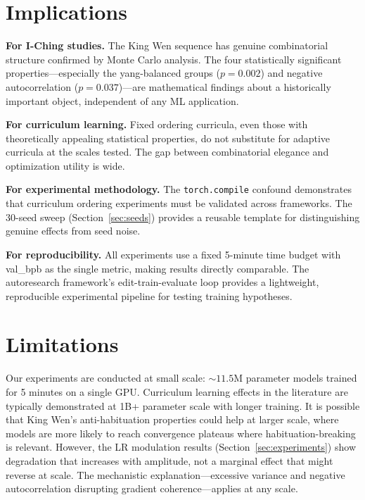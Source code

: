 \documentclass{article}
\begin{document}
\section{Implications}\label{sec:implications}

\textbf{For I-Ching studies.} The King Wen sequence has genuine combinatorial structure confirmed by Monte Carlo analysis. The four statistically significant properties---especially the yang-balanced groups ($p = 0.002$) and negative autocorrelation ($p = 0.037$)---are mathematical findings about a historically important object, independent of any ML application.

\textbf{For curriculum learning.} Fixed ordering curricula, even those with theoretically appealing statistical properties, do not substitute for adaptive curricula at the scales tested. The gap between combinatorial elegance and optimization utility is wide.

\textbf{For experimental methodology.} The \texttt{torch.compile} confound demonstrates that curriculum ordering experiments must be validated across frameworks. The 30-seed sweep (Section~\ref{sec:seeds}) provides a reusable template for distinguishing genuine effects from seed noise.

\textbf{For reproducibility.} All experiments use a fixed 5-minute time budget with val\_bpb as the single metric, making results directly comparable. The autoresearch framework's edit-train-evaluate loop provides a lightweight, reproducible experimental pipeline for testing training hypotheses.

\section{Limitations}\label{sec:limitations}

Our experiments are conducted at small scale: ${\sim}11.5$M parameter models trained for 5 minutes on a single GPU. Curriculum learning effects in the literature are typically demonstrated at 1B+ parameter scale with longer training. It is possible that King Wen's anti-habituation properties could help at larger scale, where models are more likely to reach convergence plateaus where habituation-breaking is relevant. However, the LR modulation results (Section~\ref{sec:experiments}) show degradation that increases with amplitude, not a marginal effect that might reverse at scale. The mechanistic explanation---excessive variance and negative autocorrelation disrupting gradient coherence---applies at any scale.
\end{document}
